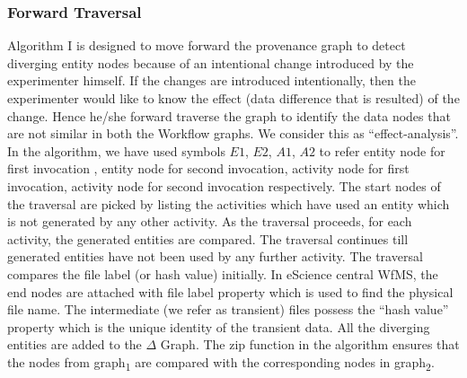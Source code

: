 \documentclass[10pt,conference,twocolumn]{IEEEtran}
\begin{document}
\subsubsection{Forward Traversal}
 Algorithm I is designed to move forward the provenance graph to detect diverging entity nodes because of an intentional change introduced by the experimenter himself. If the changes are introduced intentionally, then the experimenter would like to know the effect (data difference that is resulted) of the change.  Hence he/she   forward traverse the graph to identify the data nodes that are not similar in both  the Workflow graphs. We consider this as \enquote{effect-analysis}. In the algorithm, we have used symbols $E1$, $E2$, $A1$, $A2$ to refer entity node for first invocation , entity node for second invocation, activity node for first invocation, activity node for second invocation respectively. The start nodes of the traversal are picked by listing the activities which have used an entity which is not generated by any other activity. As the traversal proceeds, for each activity, the generated entities are compared. The traversal continues till generated entities have not been used by any further activity. The traversal compares the file label (or hash value) initially. In eScience central WfMS, the end nodes are attached with file label property which is used to find the physical file name. The intermediate (we refer as transient) files possess the \enquote{hash value} property which is the unique identity of the transient data. All the diverging entities are added to the $\Delta$ Graph. The zip function in the algorithm ensures that the nodes from graph\textsubscript{1} are compared with the corresponding nodes in graph\textsubscript{2}. 
\end{document}

